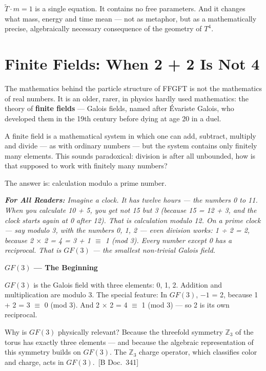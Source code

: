 \documentclass[11pt,oneside]{book}
\newcommand{\status}[1]{\penalty10000\,{\scriptsize\textcolor{gray!60}{[#1]}}}
\newenvironment{laierspur}{%
  \par\vspace{4pt}%
  \noindent\small\itshape\color{blue!60!black}%
  \textbf{For All Readers:}\enspace\ignorespaces}{%
  \par\vspace{4pt}\normalsize\normalfont\normalcolor}
\begin{document}
$\tilde{T}\cdot m = 1$ is a single equation. It contains no free parameters. And
it changes what mass, energy and time mean — not as metaphor, but as a
mathematically precise, algebraically necessary consequence of the geometry
of $T^4$.


\chapter{Finite Fields: When 2 + 2 Is Not 4}

The mathematics behind the particle structure of FFGFT is not the
mathematics of real numbers. It is an older, rarer, in physics hardly used
mathematics: the theory of \textbf{finite fields} — Galois fields, named after
Évariste Galois, who developed them in the 19th century before dying at age
20 in a duel.

A finite field is a mathematical system in which one can add, subtract,
multiply and divide — as with ordinary numbers — but the system contains
only finitely many elements. This sounds paradoxical: division is after all
unbounded, how is that supposed to work with finitely many numbers?

The answer is: calculation modulo a prime number.

\begin{laierspur}
Imagine a clock. It has twelve hours — the numbers 0 to 11. When you
calculate 10 + 5, you get not 15 but 3 (because 15 = 12 + 3, and the clock
starts again at 0 after 12). That is calculation modulo 12. On a prime
clock — say modulo 3, with the numbers {0, 1, 2} — even division works: 1 ÷
2 = 2, because 2 $\times$ 2 = 4 = 3 + 1 $\equiv$ 1 (mod 3). Every number except 0 has
a reciprocal. That is $GF(3)$ — the smallest non-trivial Galois field.
\end{laierspur}

\textbf{$GF(3)$ — The Beginning}

$GF(3)$ is the Galois field with three elements: {0, 1, 2}. Addition and
multiplication are modulo 3. The special feature: In $GF(3)$, $-1$ = 2, because
1 + 2 = 3 $\equiv$ 0 (mod 3). And 2 $\times$ 2 = 4 $\equiv$ 1 (mod 3) — so 2 is its own
reciprocal.

Why is $GF(3)$ physically relevant? Because the threefold symmetry $\mathbb{Z}_3$ of
the torus has exactly three elements — and because the algebraic
representation of this symmetry builds on $GF(3)$. The $\mathbb{Z}_3$ charge operator,
which classifies color and charge, acts in $GF(3)$. \status{B Doc.~341}
\end{document}
